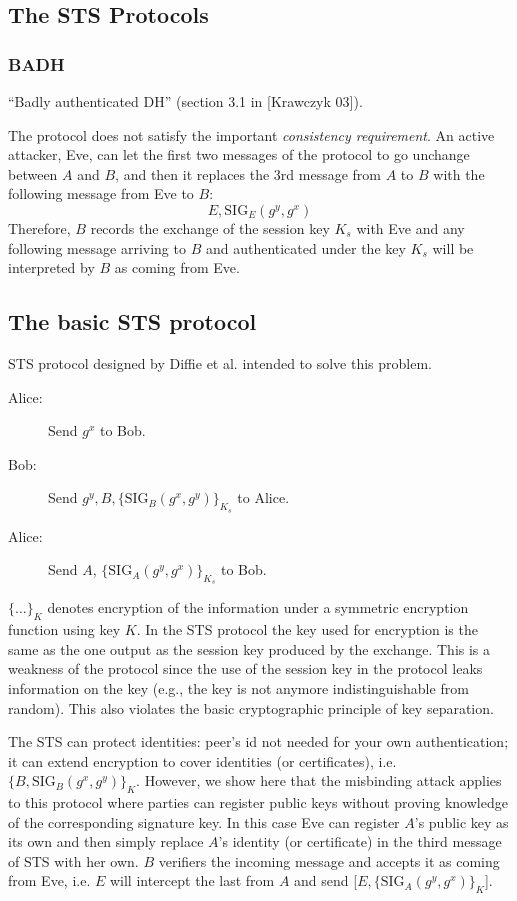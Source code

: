 \documentclass[11pt]{article}
\newcommand{\sig}{\text{SIG}}
\begin{document}
\subsection{The STS Protocols}
\subsubsection{BADH}
``Badly authenticated DH'' (section 3.1 in [Krawczyk 03]).

The protocol does not satisfy the important \emph{consistency requirement}. An active attacker, Eve, can let the first two messages of the protocol to go unchange between $A$ and $B$, and then it replaces the 3rd message from $A$ to $B$ with the following message from Eve to $B$: $$E, \sig_E(g^y, g^x)$$
Therefore, $B$ records the exchange of the session key $K_s$ with Eve and any following message arriving to $B$ and authenticated under the key $K_s$ will be interpreted by $B$ as coming from Eve.
\subsection{The basic STS protocol}
STS protocol designed by Diffie et al. \cite{DiffieOW92} intended to solve this problem. 
\begin{description}
\item[Alice:] Send $g^x$ to Bob.
\item[Bob:] Send $g^y, B,\{\sig_B(g^x, g^y)\}_{K_s}$ to Alice.
\item[Alice:] Send $A$, $\{\sig_{A}(g^y, g^x)\}_{K_s}$ to Bob.
\end{description}
$\{\ldots\}_K$ denotes encryption of the information under a symmetric encryption function using key $K$. In the STS protocol the key used for encryption is the same as the one output as the session key produced by the exchange. This is a weakness of the protocol since the use of the session key in the protocol leaks information on the key (e.g., the key is not anymore indistinguishable from random). This also violates the basic cryptographic principle of key separation. 

The STS can protect identities: peer's id not needed for your own authentication; it can extend encryption to cover identities (or certificates), i.e. $\{B, \sig_B(g^x, g^y)\}_K$. However, we show here that the misbinding attack applies to this protocol where parties can register public keys without proving knowledge of the corresponding signature key. In this case Eve can register $A$'s public key as its own and then simply replace $A$'s identity (or certificate) in the third message of STS with her own. $B$ verifiers the incoming message and accepts it as coming from Eve, i.e. $E$ will intercept the last from $A$ and send [$E, \{\sig_A(g^y, g^x)\}_K$]. 
\end{document}
